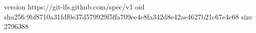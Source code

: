 version https://git-lfs.github.com/spec/v1
oid sha256:9bf8710a31fdf0e37d579929f5ffa709ee4e8fa342d8e42ae4627b21c67e4c68
size 2796388

